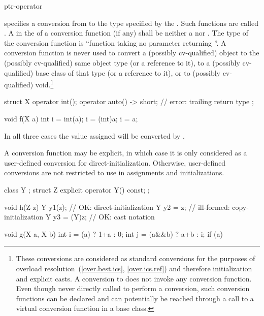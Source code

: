 \begin{bnf}
\br
    ptr-operator 
\end{bnf}

specifies a conversion from
to the type specified by the
.
Such functions are called .
A  in the 
of a conversion function (if any) shall be neither
a  nor .
%
The type of the conversion function is
``function taking no parameter returning
''.
A conversion function is never used to convert a (possibly cv-qualified) object
to the (possibly cv-qualified) same object type (or a reference to it),
to a (possibly cv-qualified) base class of that type (or a reference to it),
or to (possibly cv-qualified) void.\footnote{These conversions are considered
as standard conversions for the purposes of overload resolution~(\ref{over.best.ics}, \ref{over.ics.ref}) and therefore initialization and explicit casts. A conversion to  does not invoke any conversion function.
Even though never directly called to perform a conversion,
such conversion functions can be declared and can potentially
be reached through a call to a virtual conversion function in a base class.}
\begin{example}
\begin{codeblock}
struct X {
  operator int();
  operator auto() -> short;     // error: trailing return type
};

void f(X a) {
  int i = int(a);
  i = (int)a;
  i = a;
}
\end{codeblock}
In all three cases the value assigned will be converted by
.
\end{example}

\pnum
A conversion function may be explicit, in which case it is only considered as a user-defined conversion for direct-initialization. Otherwise, user-defined conversions are not restricted to use in assignments and initializations.
\begin{example}
\begin{codeblock}
class Y { };
struct Z {
  explicit operator Y() const;
};

void h(Z z) {
  Y y1(z);          // OK: direct-initialization
  Y y2 = z;         // ill-formed: copy-initialization
  Y y3 = (Y)z;      // OK: cast notation
}

void g(X a, X b) {
  int i = (a) ? 1+a : 0;
  int j = (a&&b) ? a+b : i;
  if (a) {
  }
}
\end{codeblock}
\end{example}

